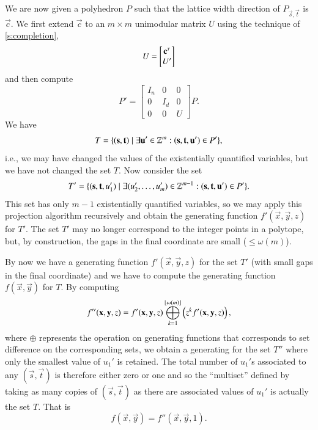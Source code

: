 We are now given a polyhedron $P$ such that the lattice width
direction of $P_{\vec s, \vec t}$ is $\vec c$.
We first extend $\vec c$ to an $m \times m$ unimodular matrix $U$
using the technique of \autoref{s:completion},
$$
U
=
\begin{bmatrix}
\vec c^\T
\\
U'
\end{bmatrix}
$$
and then compute
$$
P' =
\begin{bmatrix}
I_n & 0 & 0 \\
0 & I_d & 0 \\
0 & 0 & U
\end{bmatrix}
P
.
$$
We have
$$
T =
\{
(\vec s, \vec t) \mid
	\exists \vec u' \in \ZZ^m : (\vec s, \vec t, \vec u') \in P'
\}
,
$$
i.e., we may have changed the values of the existentially
quantified variables, but we have not changed the set $T$.
Now consider the set
$$
T' =
\{
(\vec s, \vec t, u_1') \mid
	\exists (u_2',\ldots,u_m') \in \ZZ^{m-1} :
		(\vec s, \vec t, \vec u') \in P'
\}
.
$$
This set has only $m-1$ existentially quantified variables, so
we may apply this projection algorithm recursively and obtain
the generating function $f'(\vec x, \vec y, z)$ for $T'$.
The set $T'$ may no longer correspond to the integer points
in a polytope, but, by construction, the gaps in the final
coordinate are small ($\le \omega(m)$).

By now we have a generating function $f'(\vec x, \vec y, z)$
for the set $T'$ (with small
gaps in the final coordinate) and we have to compute the
generating function $f(\vec x, \vec y)$ for $T$.
By computing
\begin{equation}
\label{eq:projection:omega}
f''(\vec x, \vec y, z) =
f'(\vec x, \vec y, z) \bigoplus_{k=1}^{\floor{\omega(m)}}
	\left( z^k f'(\vec x, \vec y, z) \right)
,
\end{equation}
where $\oplus$ represents the operation on generating functions
that corresponds to set difference on the corresponding sets,
we obtain a generating for the set $T''$ where only
the smallest value of $u_1'$ is retained.
The total number of $u_1'$s associated to any $(\vec s, \vec t)$
is therefore either zero or one and so the ``multiset'' defined
by taking as many copies of $(\vec s, \vec t)$ as there are
associated values of $u_1'$ is actually the set $T$.
That is
$$
f(\vec x, \vec y) = f''(\vec x, \vec y, 1)
.
$$

